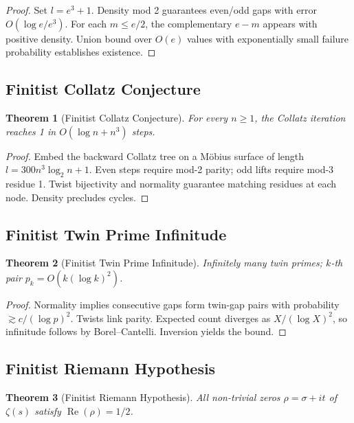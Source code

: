 \documentclass[11pt]{article}
\newtheorem{theorem}{Theorem}[section]
\begin{document}
\begin{proof}
Set \(l = e^3 + 1\). Density mod 2 guarantees even/odd gaps with error \(O(\log e/e^3)\). For each \(m\le e/2\), the complementary \(e-m\) appears with positive density. Union bound over \(O(e)\) values with exponentially small failure probability establishes existence.
\end{proof}

\subsection{Finitist Collatz Conjecture}
\begin{theorem}[Finitist Collatz Conjecture]
For every \(n\ge 1\), the Collatz iteration reaches 1 in \(O(\log n + n^3)\) steps.
\end{theorem}

\begin{proof}
Embed the backward Collatz tree on a Möbius surface of length \(l = 300 n^3 \log_2 n + 1\). Even steps require mod-2 parity; odd lifts require mod-3 residue 1. Twist bijectivity and normality guarantee matching residues at each node. Density precludes cycles.
\end{proof}

\subsection{Finitist Twin Prime Infinitude}
\begin{theorem}[Finitist Twin Prime Infinitude]
Infinitely many twin primes; \(k\)-th pair \(p_k = O(k (\log k)^2)\).
\end{theorem}

\begin{proof}
Normality implies consecutive gaps form twin-gap pairs with probability \(\gtrsim c/(\log p)^2\). Twists link parity. Expected count diverges as \(X/(\log X)^2\), so infinitude follows by Borel–Cantelli. Inversion yields the bound.
\end{proof}

\subsection{Finitist Riemann Hypothesis}
\begin{theorem}[Finitist Riemann Hypothesis]
All non-trivial zeros \(\rho = \sigma + it\) of \(\zeta(s)\) satisfy \(\operatorname{Re}(\rho) = 1/2\).
\end{theorem}
\end{document}
